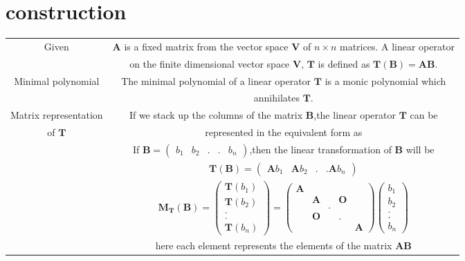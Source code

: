 \documentclass[journal,12pt,twocolumn]{IEEEtran}
\providecommand{\brak}[1]{\ensuremath{\left(#1\right)}}
\newcommand{\myvec}[1]{\ensuremath{\begin{pmatrix}#1\end{pmatrix}}}
\numberwithin{equation}{subsection}
\let\vec\mathbf
\newcommand\myemptypage{
	\null
	\thispagestyle{empty}
	\addtocounter{page}{-1}
	\newpage
}
\begin{document}
\section{construction}
\begin{table}[h]
    \centering
    \begin{tabular}{|c|c|}
    \hline
        Given &  $\vec{A}$ is a fixed matrix from the vector space $\vec{V}$ of $n\times n$ matrices. A linear operator \\
        &on the finite dimensional vector space $\vec{V}$, $\vec{T}$ is defined as $\vec{T\brak{B}}=\vec{AB}$.\\
    \hline
        Minimal polynomial & The minimal polynomial of a linear operator $\vec{T}$ is a monic polynomial which \\
        &annihilates $\vec{T}$.\\
    \hline
        Matrix representation & If we stack up the columns of the matrix $\vec{B}$,the linear operator $\vec{T}$ can be \\
        of $\vec{T}$ & represented in the equivalent form as \\
        & If $\vec{B}=\myvec{b_1&b_2&.&.&b_n}$,then the linear transformation of $\vec{B}$ will be\\
        &$\vec{T\brak{B}}=\myvec{\vec{A}b_1&\vec{A}b_2&.&.\vec{A}b_n}$\\
        & $\vec{M_T\brak{B}}=\myvec{\vec{T}\brak{b_1}\\\vec{T}\brak{b_2}\\.\\.\\\vec{T}\brak{b_n}}=\myvec{\vec{A}&&&&\\&\vec{A}&&\vec{O}&\\&&.&&\\&\vec{O}&&.&\\&&&&\vec{A}}\myvec{b_1\\b_2\\.\\.\\b_n}$\\
         & here each element represents the elements of the matrix $\vec{AB}$\\
    \hline
    \end{tabular}
\end{table}
\pagebreak
\myemptypage
\end{document}
